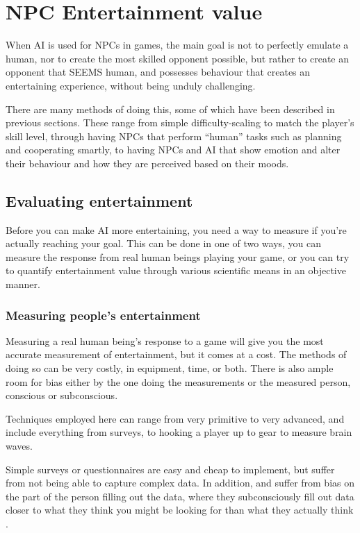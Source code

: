 \documentclass[]{report}
\let\oldmarginpar\marginpar
\renewcommand\marginpar[1]{\-\oldmarginpar[\raggedleft\footnotesize #1]%
{\raggedright\footnotesize #1}}
\begin{document}
\chapter{NPC Entertainment value}
\label{cha:npc-entert-value}

When AI is used for NPCs in games, the main goal is not to perfectly emulate a
human, nor to create the most skilled opponent possible, but rather to create an
opponent that SEEMS human, and possesses behaviour that creates an entertaining
experience, without being unduly challenging.

There are many methods of doing this, some of which have been described in
previous sections\marginpar{Link back?}. These range from simple
difficulty-scaling to match the player's skill level, through having NPCs that
perform ``human'' tasks such as planning and cooperating smartly, to having NPCs
and AI that show emotion and alter their behaviour and how they are perceived
based on their moods.

\section{Evaluating entertainment}
\label{sec:eval-entert}

Before you can make AI more entertaining, you need a way to measure if you're
actually reaching your goal. This can be done in one of two ways, you can
measure the response from real human beings playing your game, or you can try to
quantify entertainment value through various scientific means in an objective
manner.

\subsection{Measuring people's entertainment}
\label{sec:measuring-people}

Measuring a real human being's response to a game will give you the most
accurate measurement of entertainment, but it comes at a cost. The methods of
doing so can be very costly, in equipment, time, or both. There is also ample
room for bias either by the one doing the measurements or the measured person,
conscious or subconscious.

Techniques employed here can range from very primitive to very advanced, and
include everything from surveys, to hooking a player up to gear to measure brain
waves.

Simple surveys or questionnaires are easy and cheap to implement, but suffer from
not being able to capture complex data. In addition, and suffer from bias on the
part of the person filling out the data, where they subconsciously fill out data
closer to what they think you might be looking for than what they actually think
\citep{mandryk2006using}.
\end{document}
